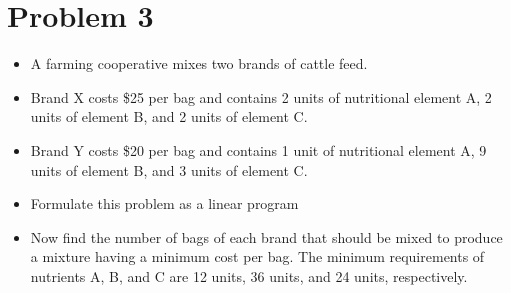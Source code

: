 \documentclass[12pt,letterpaper]{article}
\begin{document}
\newpage
\section*{Problem 3}


\begin{itemize}
    \item A farming  cooperative  mixes  two  brands  of  cattle  feed.  
    \item  Brand
X  costs  \$25  per  bag  and  contains  2  units  of  nutritional  element  A,  2  units  of  element  B,  and  2  units  of  element  C.
\item Brand  Y costs  \$20  per  bag  and  contains  1  unit  of  nutritional
element  A,  9  units  of  element  B,  and  3  units  of  element  C.
\item Formulate this problem as a linear program 
\item Now find  the  number  of  bags  of  each  brand  that  should  be  mixed to  produce  a  mixture  having  a  minimum  cost  per  bag.  The minimum  requirements  of  nutrients A,  B,  and  C  are  12  units, 36 units, and 24 units, respectively. 
\end{itemize}
\end{document}
